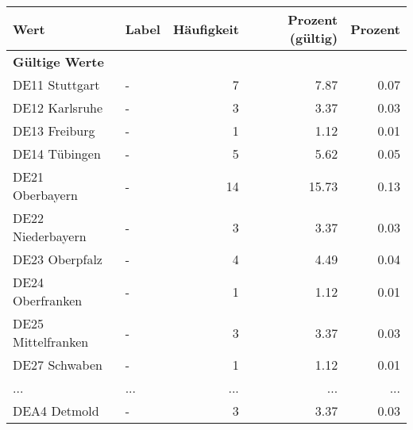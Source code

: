      \begin{longtable}{Xlrrr}
     \toprule
     \textbf{Wert} & \textbf{Label} & \textbf{Häufigkeit} & \textbf{Prozent (gültig)} & \textbf{Prozent} \\
     \endhead
     \midrule
     \multicolumn{5}{l}{\textbf{Gültige Werte}}\\
        \multicolumn{1}{X}{DE11 Stuttgart} & - & \num{7} & \num[round-mode=places,round-precision=2]{7.87} & \num[round-mode=places,round-precision=2]{0.07} \\
        \multicolumn{1}{X}{DE12 Karlsruhe} & - & \num{3} & \num[round-mode=places,round-precision=2]{3.37} & \num[round-mode=places,round-precision=2]{0.03} \\
        \multicolumn{1}{X}{DE13 Freiburg} & - & \num{1} & \num[round-mode=places,round-precision=2]{1.12} & \num[round-mode=places,round-precision=2]{0.01} \\
        \multicolumn{1}{X}{DE14 Tübingen} & - & \num{5} & \num[round-mode=places,round-precision=2]{5.62} & \num[round-mode=places,round-precision=2]{0.05} \\
        \multicolumn{1}{X}{DE21 Oberbayern} & - & \num{14} & \num[round-mode=places,round-precision=2]{15.73} & \num[round-mode=places,round-precision=2]{0.13} \\
        \multicolumn{1}{X}{DE22 Niederbayern} & - & \num{3} & \num[round-mode=places,round-precision=2]{3.37} & \num[round-mode=places,round-precision=2]{0.03} \\
        \multicolumn{1}{X}{DE23 Oberpfalz} & - & \num{4} & \num[round-mode=places,round-precision=2]{4.49} & \num[round-mode=places,round-precision=2]{0.04} \\
        \multicolumn{1}{X}{DE24 Oberfranken} & - & \num{1} & \num[round-mode=places,round-precision=2]{1.12} & \num[round-mode=places,round-precision=2]{0.01} \\
        \multicolumn{1}{X}{DE25 Mittelfranken} & - & \num{3} & \num[round-mode=places,round-precision=2]{3.37} & \num[round-mode=places,round-precision=2]{0.03} \\
        \multicolumn{1}{X}{DE27 Schwaben} & - & \num{1} & \num[round-mode=places,round-precision=2]{1.12} & \num[round-mode=places,round-precision=2]{0.01} \\
       ... & ... & ... & ... & ... \\
        \multicolumn{1}{X}{DEA4 Detmold} & - & \num{3} & \num[round-mode=places,round-precision=2]{3.37} & \num[round-mode=places,round-precision=2]{0.03} \\

\end{longtable}
